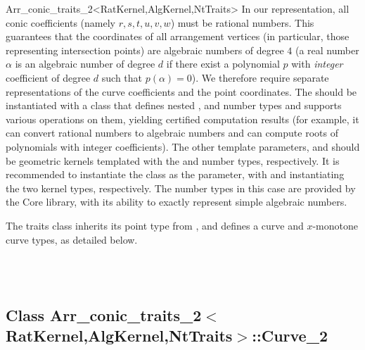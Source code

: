 \begin{ccRefClass}{Arr_conic_traits_2<RatKernel,AlgKernel,NtTraits>}
In our representation, all conic coefficients (namely $r, s, t, u, v, w$)
must be rational numbers. This guarantees that the coordinates of all
arrangement vertices (in particular, those representing intersection
points) are algebraic numbers of degree $4$ (a real number $\alpha$
is an algebraic number of degree $d$ if there exist a polynomial $p$ with
{\sl integer} coefficient of degree $d$ such that $p(\alpha) = 0$).
We therefore require separate representations of the curve coefficients and
the point coordinates. The  should be instantiated with a class
that defines nested ,  and 
number types and supports various operations on them, yielding certified
computation results (for example, it can convert rational numbers to algebraic
numbers and can compute roots of polynomials with integer coefficients).
The other template parameters,  and  should be
geometric kernels templated with the  and
 number types, respectively.
It is recommended to instantiate the 
class as the  parameter, with
 and 
instantiating the two kernel types, respectively.
The number types in this case are provided by the {\sc Core} library, with its
ability to exactly represent simple algebraic numbers.

The traits class inherits its point type from ,
and defines a curve and $x$-monotone curve types, as detailed below.

 
\ccIsModel
     \\
     \\

\ccTypes



\subsection*{Class 
        Arr\_conic\_traits\_2$<$RatKernel,AlgKernel,NtTraits$>$::Curve\_2}


\end{ccRefClass}
